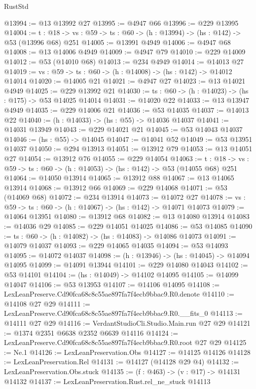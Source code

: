 \begin{lexlean}{RustStd}
\begin{coremodule}
@13994 := @13 @13992 @27
@13995 := @4947 @66
@13996 := @229 @13995
@14004 := {t : @18} ->
  {vs : @59} -> {ts : @60} -> (h : @13994) -> (hs : @142) -> @53 (@13996 @68) @251
@14005 := @13991 @4949
@14006 := @4947 @68
@14008 := @13 @14006 @4949
@14009 := @4947 @79
@14010 := @229 @14009
@14012 := @53 (@14010 @68)
@14013 := @234 @4949
@14014 := @14013 @27
@14019 := {vs : @59} -> {ts : @60} -> (h : @14008) -> (hs : @142) -> @14012 @14014
@14020 := @14005 @21
@14021 := @4947 @27
@14023 := @13 @14021 @4949
@14025 := @229 @13992 @21
@14030 := {ts : @60} -> (h : @14023) -> (hs : @175) -> @53 @14025 @14014
@14031 := @14020 @22
@14033 := @13 @13947 @4949
@14035 := @229 @14006 @21
@14036 := @53 @14035
@14037 := @14013 @22
@14040 := (h : @14033) -> (hs : @55) -> @14036 @14037
@14041 := @14031 @13949
@14043 := @229 @14021 @21
@14045 := @53 @14043 @14037
@14046 := (hs : @55) -> @14045
@14047 := @14041 @52
@14049 := @53 @13951 @14037
@14050 := @294 @13913
@14051 := @13912 @79
@14053 := @13 @14051 @27
@14054 := @13912 @76
@14055 := @229 @14054
@14063 := {t : @18} ->
  {vs : @59} -> {ts : @60} -> (h : @14053) -> (hs : @142) -> @53 (@14055 @68) @251
@14064 := @14050 @13914
@14065 := @13912 @88
@14067 := @13 @14065 @13914
@14068 := @13912 @66
@14069 := @229 @14068
@14071 := @53 (@14069 @68)
@14072 := @234 @13914
@14073 := @14072 @27
@14078 := {vs : @59} -> {ts : @60} -> (h : @14067) -> (hs : @142) -> @14071 @14073
@14079 := @14064 @13951
@14080 := @13912 @68
@14082 := @13 @14080 @13914
@14083 := @14036 @29
@14085 := @229 @14051 @14025
@14086 := @53 @14085
@14090 := {ts : @60} -> (h : @14082) -> (hs : @14083) -> @14086 @14073
@14091 := @14079 @14037
@14093 := @229 @14065 @14035
@14094 := @53 @14093
@14095 := @14072 @14037
@14098 := (h : @13946) -> (hs : @14045) -> @14094 @14095
@14099 := @14091 @13944
@14101 := @229 @14080 @14043
@14102 := @53 @14101
@14104 := (hs : @14049) -> @14102 @14095
@14105 := @14099 @14047
@14106 := @53 @13953
@14107 := @14106 @14095
@14108 := LexLeanPreserve.Cd90fca68c8c55ae897fa7f4ecb9bbac9.R0.denote
@14110 := @14108 @27 @29
@14111 := LexLeanPreserve.Cd90fca68c8c55ae897fa7f4ecb9bbac9.R0.__fits_0
@14113 := @14111 @27 @29
@14116 := VerdantStudioCli.Studio.Main.run @27 @29
@14121 := @1374 @2351 @6638 @2352 @6639 @14116
@14124 := LexLeanPreserve.Cd90fca68c8c55ae897fa7f4ecb9bbac9.R0.root @27 @29
@14125 := Ne.{1}
@14126 := LexLeanPreservation.Obs
@14127 := @14125 @14126
@14128 := LexLeanPreservation.Rel
@14131 := @14127 (@14128 @29 @4)
@14132 := LexLeanPreservation.Obs.stuck
@14135 := (f : @463) -> (v : @17) -> @14131 @14132
@14137 := LexLeanPreservation.Rust.rel_ne_stuck @14113

\end{coremodule}
\end{lexlean}
